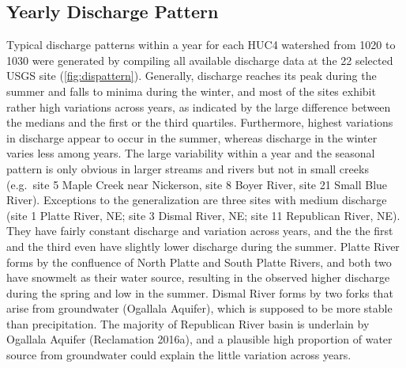 \documentclass[12pt,]{article}
\begin{document}
\hypertarget{yearly-discharge-pattern}{%
\subsection{Yearly Discharge Pattern}\label{yearly-discharge-pattern}}

Typical discharge patterns within a year for each HUC4 watershed from
1020 to 1030 were generated by compiling all available discharge data at
the 22 selected USGS site (\autoref{fig:dispattern}). Generally,
discharge reaches its peak during the summer and falls to minima during
the winter, and most of the sites exhibit rather high variations across
years, as indicated by the large difference between the medians and the
first or the third quartiles. Furthermore, highest variations in
discharge appear to occur in the summer, whereas discharge in the winter
varies less among years. The large variability within a year and the
seasonal pattern is only obvious in larger streams and rivers but not in
small creeks (e.g.~site 5 Maple Creek near Nickerson, site 8 Boyer
River, site 21 Small Blue River). Exceptions to the generalization are
three sites with medium discharge (site 1 Platte River, NE; site 3
Dismal River, NE; site 11 Republican River, NE). They have fairly
constant discharge and variation across years, and the the first and the
third even have slightly lower discharge during the summer. Platte River
forms by the confluence of North Platte and South Platte Rivers, and
both two have snowmelt as their water source, resulting in the observed
higher discharge during the spring and low in the summer. Dismal River
forms by two forks that arise from groundwater (Ogallala Aquifer), which
is supposed to be more stable than precipitation. The majority of
Republican River basin is underlain by Ogallala Aquifer (Reclamation
2016a), and a plausible high proportion of water source from groundwater
could explain the little variation across years.
\end{document}
